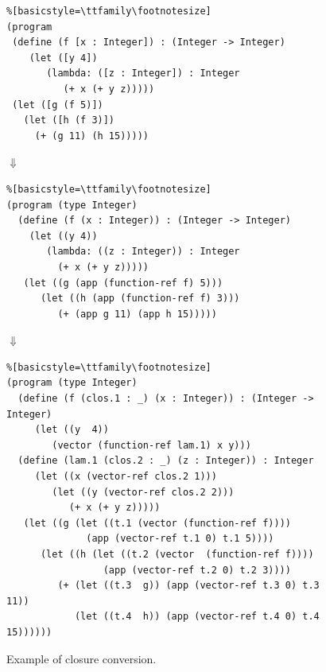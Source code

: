 \documentclass[11pt]{book}
\begin{document}
\begin{figure}[h]
\begin{minipage}{0.8\textwidth}
\begin{lstlisting}%[basicstyle=\ttfamily\footnotesize]
(program
 (define (f [x : Integer]) : (Integer -> Integer)
    (let ([y 4])
       (lambda: ([z : Integer]) : Integer
          (+ x (+ y z)))))
 (let ([g (f 5)])
   (let ([h (f 3)])
     (+ (g 11) (h 15)))))
\end{lstlisting}
$\Downarrow$
\begin{lstlisting}%[basicstyle=\ttfamily\footnotesize]
(program (type Integer)
  (define (f (x : Integer)) : (Integer -> Integer)
    (let ((y 4))
       (lambda: ((z : Integer)) : Integer
         (+ x (+ y z)))))
   (let ((g (app (function-ref f) 5)))
      (let ((h (app (function-ref f) 3)))
         (+ (app g 11) (app h 15)))))
\end{lstlisting}
$\Downarrow$
\begin{lstlisting}%[basicstyle=\ttfamily\footnotesize]
(program (type Integer)
  (define (f (clos.1 : _) (x : Integer)) : (Integer -> Integer)
     (let ((y  4))
        (vector (function-ref lam.1) x y)))
  (define (lam.1 (clos.2 : _) (z : Integer)) : Integer
     (let ((x (vector-ref clos.2 1)))
        (let ((y (vector-ref clos.2 2)))
           (+ x (+ y z)))))
   (let ((g (let ((t.1 (vector (function-ref f))))
              (app (vector-ref t.1 0) t.1 5))))
      (let ((h (let ((t.2 (vector  (function-ref f))))
                 (app (vector-ref t.2 0) t.2 3))))
         (+ (let ((t.3  g)) (app (vector-ref t.3 0) t.3 11))
            (let ((t.4  h)) (app (vector-ref t.4 0) t.4 15))))))
\end{lstlisting}
\end{minipage}

\caption{Example of closure conversion.}
\label{fig:lexical-functions-example}
\end{figure}
\end{document}

